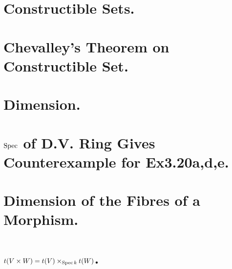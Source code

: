 \documentclass[a4paper]{jsarticle}
\begin{document}
\section{Constructible Sets.} %

\section{Chevalley's Theorem on Constructible Set.} %

\section{Dimension.} %

\section{$\operatorname{Spec}$ of D.V. Ring Gives Counterexample for Ex3.20a,d,e.} %

\section{Dimension of the Fibres of a Morphism.} %

\section{$t(V \times W)=t(V) \times_{\operatorname{Spec} k} t(W)$.} %
\end{document}
